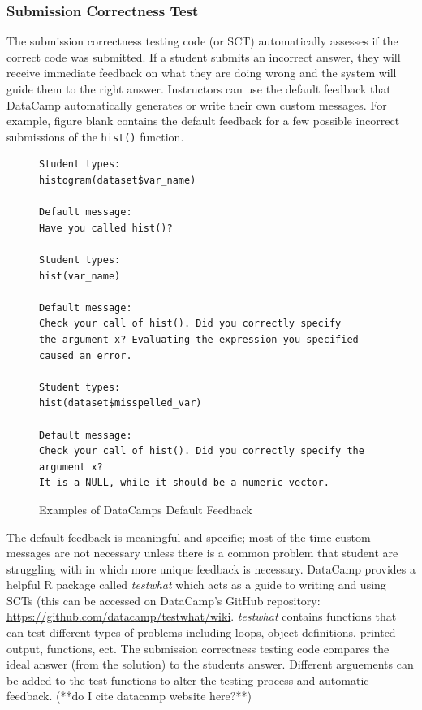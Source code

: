 \documentclass[12pt]{article}\usepackage[]{graphicx}\usepackage[]{color}
\begin{document}
\subsubsection{Submission Correctness Test}
The submission correctness testing code (or SCT) automatically assesses if the correct code was submitted. If a student submits an 
incorrect answer, they will receive immediate feedback on what they are doing wrong and the system will guide them to the right answer.
Instructors can use the default feedback that DataCamp automatically generates or write their own custom messages. For example, figure blank
contains the default feedback for a few possible incorrect submissions of the \texttt{hist()} function.

\begin{figure}
\caption{Examples of DataCamps Default Feedback}
\begin{Verbatim}[frame=single]
Student types:
histogram(dataset$var_name)

Default message:
Have you called hist()?

Student types:
hist(var_name)

Default message:
Check your call of hist(). Did you correctly specify 
the argument x? Evaluating the expression you specified
caused an error.

Student types:
hist(dataset$misspelled_var)

Default message:
Check your call of hist(). Did you correctly specify the
argument x? 
It is a NULL, while it should be a numeric vector.

\end{Verbatim}
\label{fig:code1}
\end{figure}
The default feedback is meaningful and specific; most of the time custom 
messages are not necessary unless there is a common problem that student are struggling with in which more unique feedback is necessary. 
DataCamp provides a helpful R package called \textit{testwhat} which acts as a guide to writing and using SCTs (this can be accessed on DataCamp's GitHub 
repository: \url{https://github.com/datacamp/testwhat/wiki}. 
\textit{testwhat} contains functions that can test different types of problems including loops, object definitions, printed output, functions, ect.
The submission correctness testing code compares the ideal answer (from the solution) to the students answer. Different
arguements can be added to the test functions to alter the testing process and automatic feedback. (**do I cite datacamp website here?**)
\end{document}
